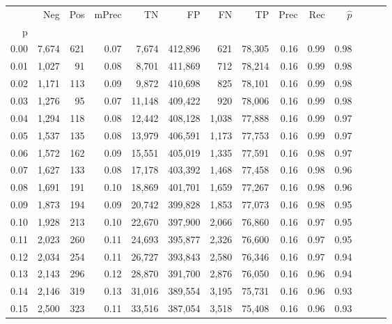 \begin{tabular}{rrrrrrrrrrrrrr}
\toprule
{} &     Neg &    Pos & mPrec &       TN &       FP &      FN &      TP &  Prec &   Rec & $\hat{p}$ \\
p    &         &        &       &          &          &         &         &       &       &           \\
\midrule
0.00 &   7,674 &    621 &  0.07 &    7,674 &  412,896 &     621 &  78,305 &  0.16 &  0.99 &      0.98 \\
0.01 &   1,027 &     91 &  0.08 &    8,701 &  411,869 &     712 &  78,214 &  0.16 &  0.99 &      0.98 \\
0.02 &   1,171 &    113 &  0.09 &    9,872 &  410,698 &     825 &  78,101 &  0.16 &  0.99 &      0.98 \\
0.03 &   1,276 &     95 &  0.07 &   11,148 &  409,422 &     920 &  78,006 &  0.16 &  0.99 &      0.98 \\
0.04 &   1,294 &    118 &  0.08 &   12,442 &  408,128 &   1,038 &  77,888 &  0.16 &  0.99 &      0.97 \\
0.05 &   1,537 &    135 &  0.08 &   13,979 &  406,591 &   1,173 &  77,753 &  0.16 &  0.99 &      0.97 \\
0.06 &   1,572 &    162 &  0.09 &   15,551 &  405,019 &   1,335 &  77,591 &  0.16 &  0.98 &      0.97 \\
0.07 &   1,627 &    133 &  0.08 &   17,178 &  403,392 &   1,468 &  77,458 &  0.16 &  0.98 &      0.96 \\
0.08 &   1,691 &    191 &  0.10 &   18,869 &  401,701 &   1,659 &  77,267 &  0.16 &  0.98 &      0.96 \\
0.09 &   1,873 &    194 &  0.09 &   20,742 &  399,828 &   1,853 &  77,073 &  0.16 &  0.98 &      0.95 \\
0.10 &   1,928 &    213 &  0.10 &   22,670 &  397,900 &   2,066 &  76,860 &  0.16 &  0.97 &      0.95 \\
0.11 &   2,023 &    260 &  0.11 &   24,693 &  395,877 &   2,326 &  76,600 &  0.16 &  0.97 &      0.95 \\
0.12 &   2,034 &    254 &  0.11 &   26,727 &  393,843 &   2,580 &  76,346 &  0.16 &  0.97 &      0.94 \\
0.13 &   2,143 &    296 &  0.12 &   28,870 &  391,700 &   2,876 &  76,050 &  0.16 &  0.96 &      0.94 \\
0.14 &   2,146 &    319 &  0.13 &   31,016 &  389,554 &   3,195 &  75,731 &  0.16 &  0.96 &      0.93 \\
0.15 &   2,500 &    323 &  0.11 &   33,516 &  387,054 &   3,518 &  75,408 &  0.16 &  0.96 &      0.93 \\

\end{tabular}

